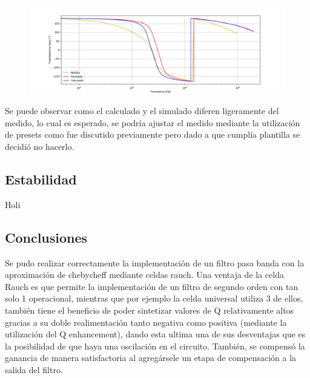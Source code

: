 \begin{figure}[H]
	\centering
	\includegraphics[width=\textwidth]{Imagenes-Ej2/BodeRauchCalcsimF.png}
	\label{fig:Bodecalcsimf}
\end{figure}
Se puede observar como el calculado y el simulado diferen ligeramente del medido, lo cual es esperado, se podría ajustar el medido mediante la utilización de presets como fue discutido previamente pero dado a que cumplía plantilla se decidió no hacerlo.
\subsection{Estabilidad}
Holi
\subsection{Conclusiones}
Se pudo realizar correctamente la implementación de un filtro pasa banda con la aproximación de chebycheff mediante celdas rauch.
Una ventaja de la celda Rauch es que permite la implementación de un filtro de segundo orden con tan solo 1 operacional, mientras que por ejemplo la celda universal utiliza 3 de ellos, también tiene el beneficio de poder sintetizar valores de Q relativamente altos gracias a su doble realimentación tanto negativa como positiva (mediante la utilización del Q enhancement), dando esta ultima una de sus desventajas que es la posibilidad de que haya una oscilación en el circuito.
También, se compensó la ganancia de manera satisfactoria al agregársele un etapa de compensación a la salida del
filtro.

%

